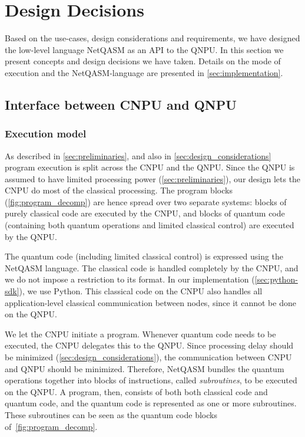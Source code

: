 \section{Design Decisions}
\label{sec:design_decisions}
Based on the use-cases, design considerations and requirements, we have designed the low-level language \ac{NetQASM} as an API to the \ac{QNPU}.
In this section we present concepts and design decisions we have taken.
Details on the mode of execution and the \ac{NetQASM}-language are presented in \cref{sec:implementation}.

\subsection{Interface between \ac{CNPU} and QNPU}
\label{sec:design_decisions_interface}

\subsubsection{Execution model}
As described in \cref{sec:preliminaries}, and also in \cref{sec:design_considerations} program execution is split across the \ac{CNPU} and the \ac{QNPU}.
Since the \ac{QNPU} is assumed to have limited processing power (\cref{sec:preliminaries}), our design lets the \ac{CNPU} do most of the classical processing.
The program blocks (\cref{fig:program_decomp}) are hence spread over two separate systems: blocks of purely classical code are executed by the \ac{CNPU}, and blocks of quantum code (containing both quantum operations and limited classical control) are executed by the \ac{QNPU}.

The quantum code (including limited classical control) is expressed using the \ac{NetQASM} language.
The classical code is handled completely by the \ac{CNPU}, and we do not impose a restriction to its format.
In our implementation (\cref{sec:python-sdk}), we use Python.
This classical code on the \ac{CNPU} also handles all application-level classical communication between nodes, since it cannot be done on the \ac{QNPU}.

We let the \ac{CNPU} initiate a program.
Whenever quantum code needs to be executed, the \ac{CNPU} delegates this to the \ac{QNPU}.
Since processing delay should be minimized (\cref{sec:design_considerations}), the communication between \ac{CNPU} and \ac{QNPU} should be minimized.
Therefore, \ac{NetQASM} bundles the quantum operations together into blocks of instructions, called \textit{subroutines}, to be executed on the \ac{QNPU}.
A program, then, consists of both both classical code and quantum code, and the quantum code is represented as one or more subroutines.
These subroutines can be seen as the quantum code blocks of~\cref{fig:program_decomp}.

